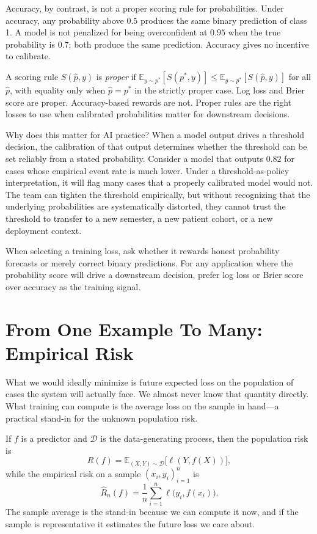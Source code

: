 Accuracy, by contrast, is not a proper scoring rule for probabilities. Under accuracy, any probability above $0.5$ produces the same binary prediction of class 1. A model is not penalized for being overconfident at $0.95$ when the true probability is $0.7$; both produce the same prediction. Accuracy gives no incentive to calibrate.

A scoring rule $S(\hat{p}, y)$ is \emph{proper} if $\mathbb{E}_{y \sim p^*}[S(p^*, y)] \leq \mathbb{E}_{y \sim p^*}[S(\hat{p}, y)]$ for all $\hat{p}$, with equality only when $\hat{p} = p^*$ in the strictly proper case. Log loss and Brier score are proper. Accuracy-based rewards are not. Proper rules are the right losses to use when calibrated probabilities matter for downstream decisions.

Why does this matter for AI practice? When a model output drives a threshold decision, the calibration of that output determines whether the threshold can be set reliably from a stated probability. Consider a model that outputs $0.82$ for cases whose empirical event rate is much lower. Under a threshold-as-policy interpretation, it will flag many cases that a properly calibrated model would not. The team can tighten the threshold empirically, but without recognizing that the underlying probabilities are systematically distorted, they cannot trust the threshold to transfer to a new semester, a new patient cohort, or a new deployment context.

When selecting a training loss, ask whether it rewards honest probability forecasts or merely correct binary predictions. For any application where the probability score will drive a downstream decision, prefer log loss or Brier score over accuracy as the training signal.

\section*{From One Example To Many: Empirical Risk}

What we would ideally minimize is future expected loss on the population of cases the system will actually face. We almost never know that quantity directly. What training can compute is the average loss on the sample in hand---a practical stand-in for the unknown population risk.

If \(f\) is a predictor and \(\mathcal{D}\) is the data-generating process, then the population risk is
\[
R(f) = \mathbb{E}_{(X,Y)\sim \mathcal{D}}\!\bigl[\ell(Y,f(X))\bigr],
\]
while the empirical risk on a sample \((x_i,y_i)_{i=1}^n\) is
\[
\hat{R}_n(f) = \frac{1}{n}\sum_{i=1}^n \ell\bigl(y_i,f(x_i)\bigr).
\]
The sample average is the stand-in because we can compute it now, and if the sample is representative it estimates the future loss we care about.

